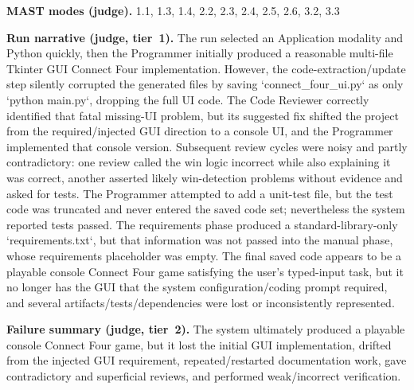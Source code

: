 \textbf{MAST modes (judge).} 1.1, 1.3, 1.4, 2.2, 2.3, 2.4, 2.5, 2.6, 3.2, 3.3

\textbf{Run narrative (judge, tier~1).} The run selected an Application modality and Python quickly, then the Programmer initially produced a reasonable multi-file Tkinter GUI Connect Four implementation. However, the code-extraction/update step silently corrupted the generated files by saving `connect\_four\_ui.py` as only `python main.py`, dropping the full UI code. The Code Reviewer correctly identified that fatal missing-UI problem, but its suggested fix shifted the project from the required/injected GUI direction to a console UI, and the Programmer implemented that console version. Subsequent review cycles were noisy and partly contradictory: one review called the win logic incorrect while also explaining it was correct, another asserted likely win-detection problems without evidence and asked for tests. The Programmer attempted to add a unit-test file, but the test code was truncated and never entered the saved code set; nevertheless the system reported tests passed. The requirements phase produced a standard-library-only `requirements.txt`, but that information was not passed into the manual phase, whose requirements placeholder was empty. The final saved code appears to be a playable console Connect Four game satisfying the user's typed-input task, but it no longer has the GUI that the system configuration/coding prompt required, and several artifacts/tests/dependencies were lost or inconsistently represented.

\textbf{Failure summary (judge, tier~2).} The system ultimately produced a playable console Connect Four game, but it lost the initial GUI implementation, drifted from the injected GUI requirement, repeated/restarted documentation work, gave contradictory and superficial reviews, and performed weak/incorrect verification.

